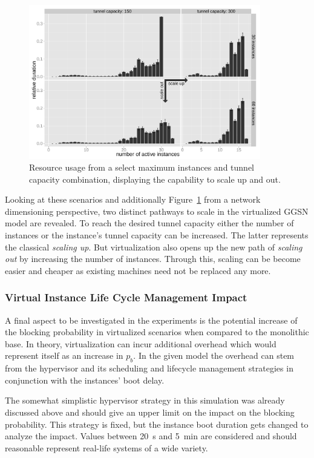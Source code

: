 \begin{figure}[htb]
	\centering
	\includegraphics[width=0.9\textwidth]{images/R-virtualized-instanceuse-barplot.pdf}
	\caption{Resource usage from a select maximum instances and tunnel capacity combination, displaying the capability to scale up and out.}
\label{c4:fig:res-usage-barplot}
\end{figure}


Looking at these scenarios and additionally Figure~\ref{c4:fig:res-usage-barplot} from a network dimensioning perspective, two distinct pathways to scale in the virtualized \gls{GGSN} model are revealed. To reach the desired tunnel capacity either the number of instances or the instance's tunnel capacity can be increased. The latter represents the classical \textit{scaling up}. But virtualization also opens up the new path of \textit{scaling out} by increasing the number of instances. Through this, scaling can be become easier and cheaper as existing machines need not be replaced any more.


\subsubsection{Virtual Instance Life Cycle Management Impact}

A final aspect to be investigated in the experiments is the potential increase of the blocking probability in virtualized scenarios when compared to the monolithic base. In theory, virtualization can incur additional overhead which would represent itself as an increase in $p_b$. In the given model the overhead can stem from the hypervisor and its scheduling  and lifecycle management strategies in conjunction with the instances' boot delay. 

The somewhat simplistic hypervisor strategy in this simulation was already discussed above and should give an upper limit on the impact on the blocking probability. This strategy is fixed, but the instance boot duration gets changed to analyze the impact. Values between \SI{20}{\second} and \SI{5}{\minute} are considered and should reasonable represent real-life systems of a wide variety.

